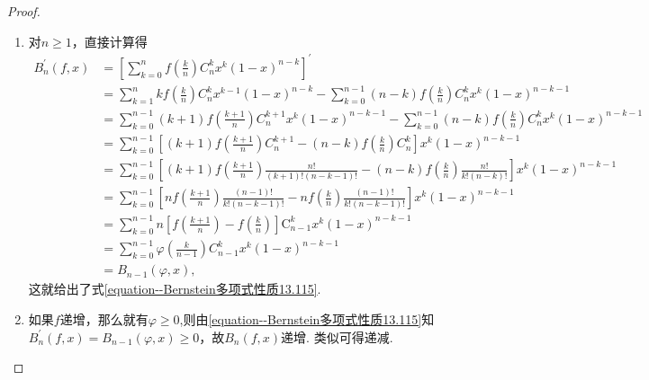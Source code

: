 \documentclass[../../main.tex]{subfiles}
\begin{document}
\begin{proof}
\begin{enumerate}[(1)]
\item 对\(n\geqslant1\)，直接计算得
\begin{align*}
B_n^\prime(f,x)&=\left[\sum_{k = 0}^n f\left(\frac{k}{n}\right)C_n^k x^k(1 - x)^{n - k}\right]^\prime\\
&=\sum_{k = 1}^n kf\left(\frac{k}{n}\right)C_n^k x^{k - 1}(1 - x)^{n - k}-\sum_{k = 0}^{n - 1}(n - k)f\left(\frac{k}{n}\right)C_n^k x^k(1 - x)^{n - k - 1}\\
&=\sum_{k = 0}^{n - 1}(k + 1)f\left(\frac{k + 1}{n}\right)C_n^{k + 1}x^k(1 - x)^{n - k - 1}-\sum_{k = 0}^{n - 1}(n - k)f\left(\frac{k}{n}\right)C_n^k x^k(1 - x)^{n - k - 1}\\
&=\sum_{k=0}^{n-1}{\left[ \left( k+1 \right) f\left( \frac{k+1}{n} \right) C_{n}^{k+1}-\left( n-k \right) f\left( \frac{k}{n} \right) C_{n}^{k} \right] x^k\left( 1-x \right) ^{n-k-1}}
\\
&=\sum_{k=0}^{n-1}{\left[ \left( k+1 \right) f\left( \frac{k+1}{n} \right) \frac{n!}{\left( k+1 \right) !\left( n-k-1 \right) !}-\left( n-k \right) f\left( \frac{k}{n} \right) \frac{n!}{k!\left( n-k \right) !} \right] x^k\left( 1-x \right) ^{n-k-1}}
\\
&=\sum_{k=0}^{n-1}{\left[ nf\left( \frac{k+1}{n} \right) \frac{\left( n-1 \right) !}{k!\left( n-k-1 \right) !}-nf\left( \frac{k}{n} \right) \frac{\left( n-1 \right) !}{k!\left( n-k-1 \right) !} \right] x^k\left( 1-x \right) ^{n-k-1}}
\\
&=\sum_{k=0}^{n-1}{n\left[ f\left( \frac{k+1}{n} \right) -f\left( \frac{k}{n} \right) \right] \mathrm{C}_{n-1}^{k}x^k\left( 1-x \right) ^{n-k-1}}
\\
&=\sum_{k = 0}^{n - 1}\varphi\left(\frac{k}{n - 1}\right)C_{n - 1}^k x^k(1 - x)^{n - k - 1}\\
&=B_{n - 1}(\varphi,x),
\end{align*}
这就给出了式\eqref{equation--Bernstein多项式性质13.115}. 

\item 如果\(f\)递增，那么就有$\varphi\geqslant 0$,则由\eqref{equation--Bernstein多项式性质13.115}知\(B_n^\prime(f,x)=B_{n - 1}(\varphi,x)\geqslant0\)，故\(B_n(f,x)\)递增. 类似可得递减.


\end{enumerate}
\end{proof}
\end{document}
